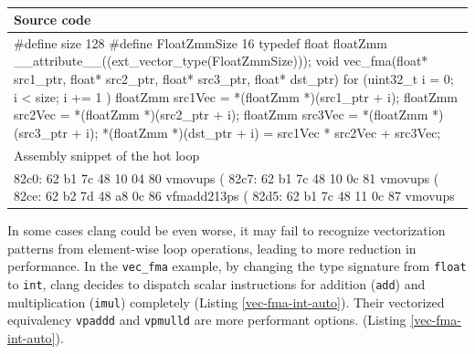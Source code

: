 \documentclass[logo,bsc,singlespacing,parskip]{infthesis}
\newenvironment{VerbatimCompact}
  {\vspace*{-2.5mm}\VerbatimEnvironment
   \par\Verbatim}
  {\endVerbatim\vspace*{-2.4mm}}
\begin{document}
\begin{table}[H]\captionsetup{name=Listing}
\begin{tabular}{>{\raggedright\arraybackslash}p{14cm}}
    Source code\\
    \midrule
    \begin{VerbatimCompact}
#define size 128
#define FloatZmmSize 16
typedef float floatZmm __attribute__((ext_vector_type(FloatZmmSize)));
void vec_fma(float* src1_ptr, float* src2_ptr,
             float* src3_ptr, float* dst_ptr) {
    for (uint32_t i = 0; i < size; i += 1 ){
        floatZmm src1Vec = *(floatZmm *)(src1_ptr + i);
        floatZmm src2Vec = *(floatZmm *)(src2_ptr + i);
        floatZmm src3Vec = *(floatZmm *)(src3_ptr + i);
        *(floatZmm *)(dst_ptr + i) = src1Vec * src2Vec + src3Vec;
    }
}
    \end{VerbatimCompact}
    \\
    Assembly snippet of the hot loop\\
    \midrule
    \begin{VerbatimCompact}
82c0: 62 b1 7c 48 10 04 80   vmovups (%
82c7: 62 b1 7c 48 10 0c 81   vmovups (%
82ce: 62 b2 7d 48 a8 0c 86   vfmadd213ps (%
82d5: 62 b1 7c 48 11 0c 87   vmovups %
    \end{VerbatimCompact}
    \\
\end{tabular}
\caption{}
\label{table:vec-fma-float-vecty}
\end{table}
    



In some cases clang could be even worse, it may fail to recognize vectorization
patterns from element-wise loop operations, leading to more reduction in
performance. In the \texttt{vec\_fma} example, by changing the type signature
from \texttt{float} to \texttt{int}, clang decides to dispatch scalar
instructions for addition (\texttt{add}) and multiplication (\texttt{imul})
completely (Listing \ref{vec-fma-int-auto}). Their vectorized equivalency
\texttt{vpaddd} and \texttt{vpmulld} are more performant options. (Listing
\ref{vec-fma-int-auto}).
\end{document}
